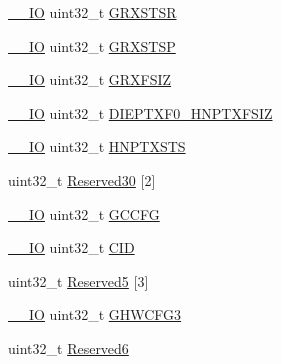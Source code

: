 \begin{DoxyCompactItemize}
\item 
\mbox{\hyperlink{core__sc300_8h_aec43007d9998a0a0e01faede4133d6be}{\+\_\+\+\_\+\+IO}} uint32\+\_\+t \mbox{\hyperlink{struct_u_s_b___o_t_g___global_type_def_a77b651a1120fc5fb647eaccac6f002c6}{G\+R\+X\+S\+T\+SR}}
\item 
\mbox{\hyperlink{core__sc300_8h_aec43007d9998a0a0e01faede4133d6be}{\+\_\+\+\_\+\+IO}} uint32\+\_\+t \mbox{\hyperlink{struct_u_s_b___o_t_g___global_type_def_a060364111cf507dfab9bb6503477983a}{G\+R\+X\+S\+T\+SP}}
\item 
\mbox{\hyperlink{core__sc300_8h_aec43007d9998a0a0e01faede4133d6be}{\+\_\+\+\_\+\+IO}} uint32\+\_\+t \mbox{\hyperlink{struct_u_s_b___o_t_g___global_type_def_ade50afc41de620913eaf1bc66d93cd3a}{G\+R\+X\+F\+S\+IZ}}
\item 
\mbox{\hyperlink{core__sc300_8h_aec43007d9998a0a0e01faede4133d6be}{\+\_\+\+\_\+\+IO}} uint32\+\_\+t \mbox{\hyperlink{struct_u_s_b___o_t_g___global_type_def_aa68d26991ddeec06897297c110c11503}{D\+I\+E\+P\+T\+X\+F0\+\_\+\+H\+N\+P\+T\+X\+F\+S\+IZ}}
\item 
\mbox{\hyperlink{core__sc300_8h_aec43007d9998a0a0e01faede4133d6be}{\+\_\+\+\_\+\+IO}} uint32\+\_\+t \mbox{\hyperlink{struct_u_s_b___o_t_g___global_type_def_a99c998f37e7a88a26f22defb10a1e83a}{H\+N\+P\+T\+X\+S\+TS}}
\item 
uint32\+\_\+t \mbox{\hyperlink{struct_u_s_b___o_t_g___global_type_def_a978a73c27d2afe65def81f28b881e138}{Reserved30}} \mbox{[}2\mbox{]}
\item 
\mbox{\hyperlink{core__sc300_8h_aec43007d9998a0a0e01faede4133d6be}{\+\_\+\+\_\+\+IO}} uint32\+\_\+t \mbox{\hyperlink{struct_u_s_b___o_t_g___global_type_def_a9f94762e8ec6d3984e2da3f48bae8a7b}{G\+C\+C\+FG}}
\item 
\mbox{\hyperlink{core__sc300_8h_aec43007d9998a0a0e01faede4133d6be}{\+\_\+\+\_\+\+IO}} uint32\+\_\+t \mbox{\hyperlink{struct_u_s_b___o_t_g___global_type_def_a5c67046606b7e64fb03c4ac550156156}{C\+ID}}
\item 
uint32\+\_\+t \mbox{\hyperlink{struct_u_s_b___o_t_g___global_type_def_a09a6f110e580becd4050cf67f93c4908}{Reserved5}} \mbox{[}3\mbox{]}
\item 
\mbox{\hyperlink{core__sc300_8h_aec43007d9998a0a0e01faede4133d6be}{\+\_\+\+\_\+\+IO}} uint32\+\_\+t \mbox{\hyperlink{struct_u_s_b___o_t_g___global_type_def_a4d0af4dfa531b5fcc09a421399963aaa}{G\+H\+W\+C\+F\+G3}}
\item 
uint32\+\_\+t \mbox{\hyperlink{struct_u_s_b___o_t_g___global_type_def_a4a273db791acbfdf89594c9d4005e7e1}{Reserved6}}

\end{DoxyCompactItemize}
